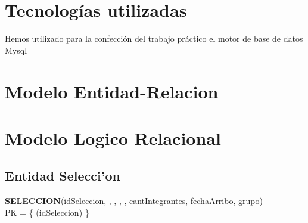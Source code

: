 \documentclass[11pt, a4paper, spanish]{article}
\newenvironment{borde}[1]
{\begin{lrbox}{\fmbox}\begin{minipage}{#1}}
{\end{minipage}\end{lrbox}\fbox{\usebox{\fmbox}}\\[10pt]}
\begin{document}


\newpage
\section{Tecnolog\'ias utilizadas}
Hemos utilizado para la confecci\'on del trabajo pr\'actico el motor de base de datos Mysql

\newpage
	
\section{Modelo Entidad-Relacion}

	

\section{Modelo Logico Relacional}

\subsection{Entidad Selecci'on}
\textbf{SELECCION}(\underline{idSeleccion}, , , , , cantIntegrantes, fechaArribo, grupo)\\

PK = \{ (idSeleccion) \}\\
\\
\\
\end{document}
